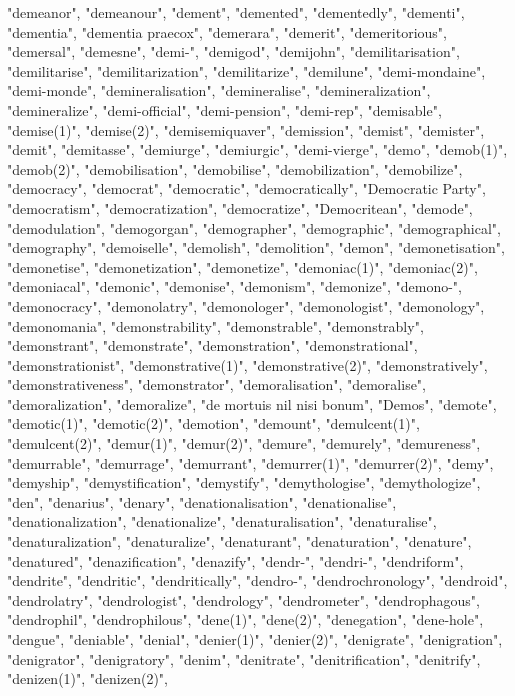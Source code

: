 "demeanor",
"demeanour",
"dement",
"demented",
"dementedly",
"dementi",
"dementia",
"dementia praecox",
"demerara",
"demerit",
"demeritorious",
"demersal",
"demesne",
"demi-",
"demigod",
"demijohn",
"demilitarisation",
"demilitarise",
"demilitarization",
"demilitarize",
"demilune",
"demi-mondaine",
"demi-monde",
"demineralisation",
"demineralise",
"demineralization",
"demineralize",
"demi-official",
"demi-pension",
"demi-rep",
"demisable",
"demise(1)",
"demise(2)",
"demisemiquaver",
"demission",
"demist",
"demister",
"demit",
"demitasse",
"demiurge",
"demiurgic",
"demi-vierge",
"demo",
"demob(1)",
"demob(2)",
"demobilisation",
"demobilise",
"demobilization",
"demobilize",
"democracy",
"democrat",
"democratic",
"democratically",
"Democratic Party",
"democratism",
"democratization",
"democratize",
"Democritean",
"demode",
"demodulation",
"demogorgan",
"demographer",
"demographic",
"demographical",
"demography",
"demoiselle",
"demolish",
"demolition",
"demon",
"demonetisation",
"demonetise",
"demonetization",
"demonetize",
"demoniac(1)",
"demoniac(2)",
"demoniacal",
"demonic",
"demonise",
"demonism",
"demonize",
"demono-",
"demonocracy",
"demonolatry",
"demonologer",
"demonologist",
"demonology",
"demonomania",
"demonstrability",
"demonstrable",
"demonstrably",
"demonstrant",
"demonstrate",
"demonstration",
"demonstrational",
"demonstrationist",
"demonstrative(1)",
"demonstrative(2)",
"demonstratively",
"demonstrativeness",
"demonstrator",
"demoralisation",
"demoralise",
"demoralization",
"demoralize",
"de mortuis nil nisi bonum",
"Demos",
"demote",
"demotic(1)",
"demotic(2)",
"demotion",
"demount",
"demulcent(1)",
"demulcent(2)",
"demur(1)",
"demur(2)",
"demure",
"demurely",
"demureness",
"demurrable",
"demurrage",
"demurrant",
"demurrer(1)",
"demurrer(2)",
"demy",
"demyship",
"demystification",
"demystify",
"demythologise",
"demythologize",
"den",
"denarius",
"denary",
"denationalisation",
"denationalise",
"denationalization",
"denationalize",
"denaturalisation",
"denaturalise",
"denaturalization",
"denaturalize",
"denaturant",
"denaturation",
"denature",
"denatured",
"denazification",
"denazify",
"dendr-",
"dendri-",
"dendriform",
"dendrite",
"dendritic",
"dendritically",
"dendro-",
"dendrochronology",
"dendroid",
"dendrolatry",
"dendrologist",
"dendrology",
"dendrometer",
"dendrophagous",
"dendrophil",
"dendrophilous",
"dene(1)",
"dene(2)",
"denegation",
"dene-hole",
"dengue",
"deniable",
"denial",
"denier(1)",
"denier(2)",
"denigrate",
"denigration",
"denigrator",
"denigratory",
"denim",
"denitrate",
"denitrification",
"denitrify",
"denizen(1)",
"denizen(2)",
